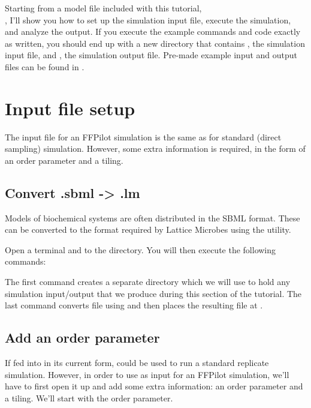 {Starting from a  model file included with this tutorial,\\
\pth{\sbmlpath}, I'll show you how to set up the simulation input file, execute the simulation, and analyze the output. If you execute the example commands and code exactly as written, you should end up with a new directory \pth{\datapath} that contains \pth{\lm}, the simulation input file, and \pth{\out}, the simulation output file. Pre-made example input and output files can be found in \pth{\datawpath}.

\section{Input file setup}\label{sec:srg_mfpt_input_setup}
The input file for an FFPilot simulation is the same as for standard (\ie direct sampling) simulation. However, some extra information is required, in the form of an order parameter and a tiling. %

\subsection{Convert .sbml -> .lm}\label{sec:sbml_conversion_srg}
Models of biochemical systems are often distributed in the SBML format. These can be converted to the  format required by Lattice Microbes using the  utility.

Open a terminal and  to the \pth{\dir} directory. You will then execute the following commands:


The first command creates a separate \pth{\datapath} directory which we will use to hold any simulation input/output that we produce during this section of the tutorial. The last command converts \pth{\sbmlpath} file using   and then places the resulting  file at \pth{\lmpath}.

\subsection{Add an order parameter}\label{sec:add_op}
If fed into  in its current form, \pth{\lm} could be used to run a standard replicate simulation. However, in order to use \pth{\lm} as input for an FFPilot simulation, we'll have to first open it up and add some extra information: an order parameter and a tiling. We'll start with the order parameter.

}

